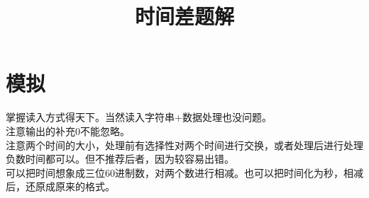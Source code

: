 \documentclass{article}
\date{}
\title{时间差题解}
\begin{document}
		\maketitle \vspace{-50pt}
		
		\section{模拟}
			\indent 掌握读入方式得天下。当然读入字符串+数据处理也没问题。\\
			\indent 注意输出的补充0不能忽略。\\
			\indent 注意两个时间的大小，处理前有选择性对两个时间进行交换，或者处理后进行处理负数时间都可以。但不推荐后者，因为较容易出错。\\
			\indent 可以把时间想象成三位60进制数，对两个数进行相减。也可以把时间化为秒，相减后，还原成原来的格式。
			
	
\end{document}
